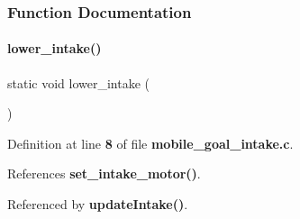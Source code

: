 \subsubsection{Function Documentation}
\mbox{\label{mobile__goal__intake_8c_afa91470a9891e48827fd62d18553c6ce}} 
\paragraph{lower\+\_\+intake()}
{\footnotesize\ttfamily static void lower\+\_\+intake (\begin{DoxyParamCaption}{ }\end{DoxyParamCaption})\hspace{0.3cm}{\ttfamily [static]}}



Definition at line \textbf{ 8} of file \textbf{ mobile\+\_\+goal\+\_\+intake.\+c}.



References \textbf{ set\+\_\+intake\+\_\+motor()}.



Referenced by \textbf{ update\+Intake()}.


